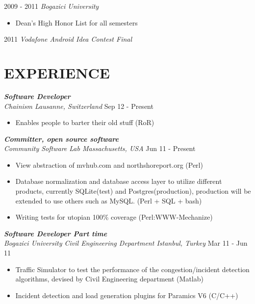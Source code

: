 \documentclass[line, margin]{res}
\begin{document}
\begin{resume}
				2009 - 2011 {\sl Bogazici University }
				\begin{itemize} \itemsep -2pt
					\item Dean's High Honor List for all semesters	
				\end{itemize}

				2011 {\sl Vodafone Android Idea Contest Final} \\
 
\section{EXPERIENCE}
				{\sl \textbf{Software Developer} \\
				Chainism Lausanne, Switzerland } \hfill Sep 12 - Present 
				\vspace{-0.3cm} \\
				\begin{itemize} \itemsep -2pt
					\item Enables people to barter their old stuff (RoR)
				\end{itemize}
 
				{\sl \textbf{Committer, open source software} \\ Community Software Lab Massachusetts, USA} \hfill Jun 11 - Present \\
				\vspace{-0.3cm}
				\begin{itemize} \itemsep -2pt
					\item View abstraction of mvhub.com and northshoreport.org (Perl)
					\item Database normalization and database access layer to utilize different products, currently SQLite(test) and Postgres(production), production will be extended to use others such as MySQL. (Perl + SQL + bash)
					\item Writing tests for utopian 100\% coverage (Perl:WWW-Mechanize)
				\end{itemize}

				{\sl \textbf{Software Developer Part time} \\ Bogazici University Civil Engineering Department Istanbul, Turkey} \hfill Mar 11 - Jun 11 \\
				\vspace{-0.3cm}
				\begin{itemize} \itemsep -2pt
					\item Traffic Simulator to test the performance of the congestion/incident detection algorithms, devised by Civil Engineering department (Matlab)
					\item Incident detection and load generation plugins for Paramics V6 (C/C++)
				\end{itemize}


\end{resume}
\end{document}
